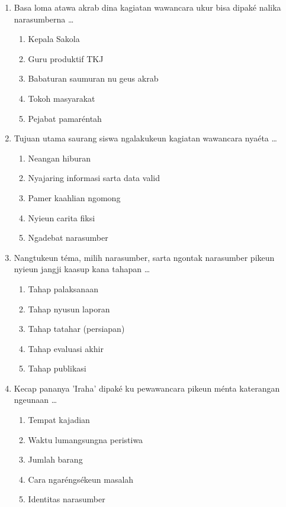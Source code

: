 \documentclass[12pt,a4paper]{article}
\begin{document}
\begin{enumerate}[leftmargin=*]
\item Basa loma atawa akrab dina kagiatan wawancara ukur bisa dipaké nalika narasumberna \dots
    \begin{enumerate}[label=\alph*.]
        \item Kepala Sakola
        \item Guru produktif TKJ
        \item Babaturan saumuran nu geus akrab
        \item Tokoh masyarakat
        \item Pejabat pamaréntah
    \end{enumerate}

\item Tujuan utama saurang siswa ngalakukeun kagiatan wawancara nyaéta \dots
    \begin{enumerate}[label=\alph*.]
        \item Neangan hiburan
        \item Nyajaring informasi sarta data valid
        \item Pamer kaahlian ngomong
        \item Nyieun carita fiksi
        \item Ngadebat narasumber
    \end{enumerate}

\item Nangtukeun téma, milih narasumber, sarta ngontak narasumber pikeun nyieun jangji kaasup kana tahapan \dots
    \begin{enumerate}[label=\alph*.]
        \item Tahap palaksanaan
        \item Tahap nyusun laporan
        \item Tahap tatahar (persiapan)
        \item Tahap evaluasi akhir
        \item Tahap publikasi
    \end{enumerate}

\item Kecap pananya 'Iraha' dipaké ku pewawancara pikeun ménta katerangan ngeunaan \dots
    \begin{enumerate}[label=\alph*.]
        \item Tempat kajadian
        \item Waktu lumangsungna peristiwa
        \item Jumlah barang
        \item Cara ngaréngsékeun masalah
        \item Identitas narasumber
    \end{enumerate}


\end{enumerate}
\end{document}
